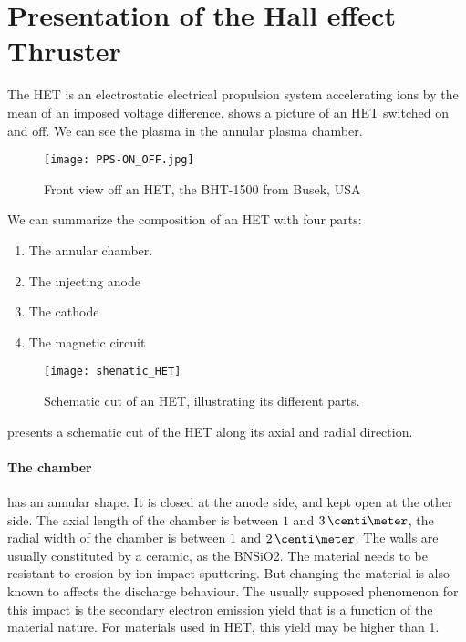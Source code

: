 

\section*{Presentation of the Hall effect Thruster }
  \label{sec-HET}


  The \ac{HET} is an electrostatic electrical propulsion system accelerating ions by the mean of an imposed voltage difference.
   shows a picture of an \ac{HET} switched on and off.
  We can see the plasma in the annular plasma chamber.


  \begin{figure}[hbtp]
    \centering
    \texttt{[image: PPS-ON\_OFF.jpg]}
    \caption{Front view off an \ac{HET}, the BHT-1500 from Busek, USA}
    \label{fig-bhtonoff}
  \end{figure}

  We can summarize the composition of an \ac{HET} with four parts\string:
  \begin{enumerate}
    \item The annular chamber.
    \item The injecting anode
    \item The cathode
    \item The magnetic circuit
  \end{enumerate}

  \begin{figure}[hbtp]
    \centering
    \texttt{[image: shematic\_HET]}
    \caption{Schematic cut of an \ac{HET}, illustrating its different parts. }
    \label{fig-shematiccut}
  \end{figure}

   presents a schematic cut of the \ac{HET} along its axial and radial direction.

  \paragraph{The chamber} has an annular shape.
  It is closed at the anode side, and kept open at the other side.
  The axial length of the chamber is between $1$ and $3\,\centi\meter$, the radial width of the chamber is between $1$ and $2\,\centi\meter$. 
  The walls are usually constituted by a ceramic, as the \ac{BNSiO2}.
  The material needs to be resistant to erosion by ion impact sputtering.
  But changing the material is also known to affects the discharge behaviour.
  The usually supposed phenomenon for this impact is the secondary electron emission yield that is a function of the material nature.
  For materials used in HET, this yield may be higher than 1.



